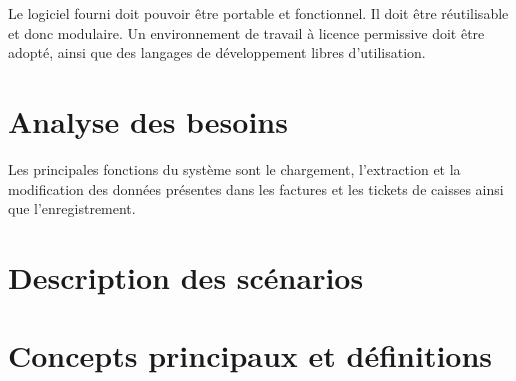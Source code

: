 Le logiciel fourni doit pouvoir être portable et fonctionnel. Il doit être réutilisable et donc modulaire. Un environnement de travail à licence permissive doit être adopté, ainsi que des langages de développement libres d’utilisation.

\section{Analyse des besoins}

Les principales fonctions du système sont le chargement, l'extraction et la modification des données présentes dans les factures et les tickets de caisses ainsi que l'enregistrement.

\section{Description des scénarios}

\section{Concepts principaux et définitions}